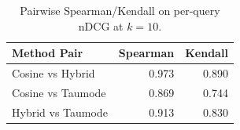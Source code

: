 \begin{table}[h]
\centering
\caption{Pairwise Spearman/Kendall on per-query nDCG at $k=10$.}
\begin{tabular}{lrr}
\toprule
Method Pair & Spearman & Kendall \\
\midrule
Cosine vs Hybrid & 0.973 & 0.890 \\
Cosine vs Taumode & 0.869 & 0.744 \\
Hybrid vs Taumode & 0.913 & 0.830 \\
\bottomrule
\end{tabular}
\end{table}

